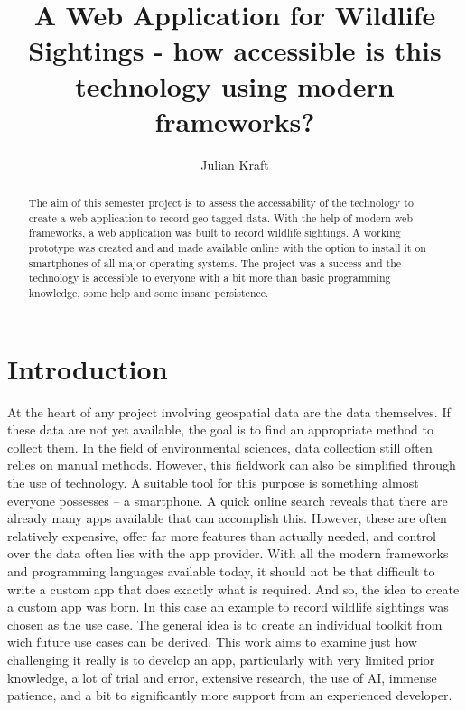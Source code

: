 \documentclass{josis}
\begin{document}


\title{A Web Application for Wildlife Sightings - how accessible is this technology using modern frameworks?}

\author{Julian Kraft}

\maketitle


\begin{abstract}
The aim of this semester project is to assess the accessability of the technology to create a web application to record geo tagged data.
With the help of modern web frameworks, a web application was built to record wildlife sightings. A working prototype was created and and made
available online with the option to install it on smartphones of all major operating systems.
The project was a success and the technology is accessible to everyone with a bit more than basic programming knowledge, some help and some 
insane persistence.

\end{abstract}

\section{Introduction}

At the heart of any project involving geospatial data are the data themselves. If these data are not yet available, 
the goal is to find an appropriate method to collect them. In the field of environmental sciences, 
data collection still often relies on manual methods. However, this fieldwork can also be simplified through the use of technology. 
A suitable tool for this purpose is something almost everyone possesses -- a smartphone.
A quick online search reveals that there are already many apps available that can accomplish this. 
However, these are often relatively expensive, offer far more features than actually needed, 
and control over the data often lies with the app provider. With all the modern frameworks 
and programming languages available today, it should not be that difficult to write a 
custom app that does exactly what is required.
And so, the idea to create a custom app was born.
In this case an example to record wildlife sightings was chosen as the use case.
The general idea is to create an individual toolkit from wich future use cases can be derived. 
This work aims to examine just how challenging it really is to develop an app, 
particularly with very limited prior knowledge, a lot of trial and error, 
extensive research, the use of AI, immense patience, 
and a bit to significantly more support from an experienced developer.
\end{document}
